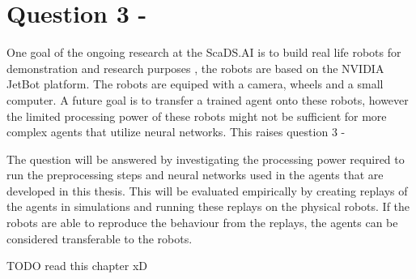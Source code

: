 \section{Question 3 - \questionThree}

One goal of the ongoing research at the ScaDS.AI is to build real life robots for demonstration and research purposes \textcite{merlin_flach}, the robots are based on the NVIDIA JetBot platform. The robots are equiped with a camera, wheels and a small computer. A future goal is to transfer a trained agent onto these robots, however the limited processing power of these robots might not be sufficient for more complex agents that utilize neural networks. This raises question 3 - \questionThree


The question will be answered by investigating the processing power required to run the preprocessing steps and neural networks used in the agents that are developed in this thesis. This will be evaluated empirically by creating replays of the agents in simulations and running these replays on the physical robots. If the robots are able to reproduce the behaviour from the replays, the agents can be considered transferable to the robots.

TODO read this chapter xD